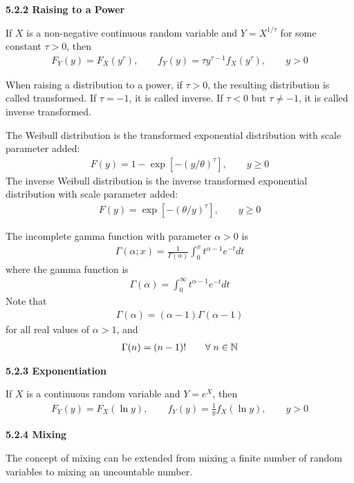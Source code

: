 \documentclass[hidelinks, 12pt]{article}
\theoremstyle{mydefstyle}
\theoremstyle{mythmstyle}
\begin{document}
\textbf{5.2.2 Raising to a Power}

If $X$ is a non-negative continuous random variable and $Y = X^{1/\tau}$ for some constant $\tau > 0$, then
\begin{gather*}
F_Y(y) = F_X\left(y^{\tau}\right), \qquad f_Y(y) = \tau y^{\tau-1}f_X(y^{\tau}), \qquad y > 0
\end{gather*}

When raising a distribution to a power, if $\tau > 0$, the resulting distribution is called transformed. If $\tau = -1$, it is called inverse. If $\tau < 0$ but $\tau \ne -1$, it is called inverse transformed. 

The Weibull distribution is the transformed exponential distribution with scale parameter added:
\begin{gather*}
F(y) = 1 - \exp[-(y/\theta)^{\tau}], \qquad y \ge 0
\end{gather*}
The inverse Weibull distribution is the inverse transformed exponential distribution with scale parameter added:
\begin{gather*}
F(y) = \exp[-(\theta/y)^{\tau}], \qquad y \ge 0
\end{gather*}

The incomplete gamma function with parameter $\alpha > 0$ is 
\begin{gather*}
\Gamma(\alpha; x) = \frac{1}{\Gamma(\alpha)} \int_0^x t^{\alpha-1} e^{-t} dt
\end{gather*}
where the gamma function is
\begin{gather*}
\Gamma(\alpha) = \int_0^{\infty} t^{\alpha-1} e^{-t} dt
\end{gather*}
Note that
\begin{gather*}
\Gamma(\alpha) = (\alpha-1)\Gamma(\alpha-1)
\end{gather*}
for all real values of $\alpha > 1$, and 
\begin{gather*}
\Gamma(n) = (n-1)! \qquad \forall \hspace{1mm} n \in \mathbb{N}
\end{gather*}

\textbf{5.2.3 Exponentiation}

If $X$ is a continuous random variable and $Y = e^X$, then
\begin{gather*}
F_Y(y) = F_X(\ln y), \qquad f_Y(y) = \frac{1}{y} f_X(\ln y), \qquad y > 0
\end{gather*}

\textbf{5.2.4 Mixing}

The concept of mixing can be extended from mixing a finite number of random variables to mixing an uncountable number. 
\end{document}
